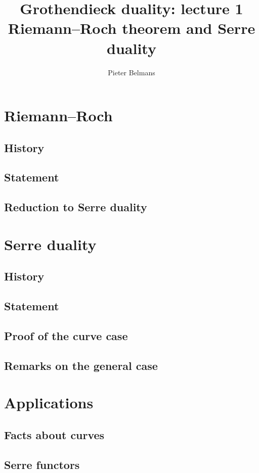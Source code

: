 \documentclass[10pt,a4paper]{article}
\title{Grothendieck duality: lecture 1 \\[.2em] \Large Riemann--Roch theorem and Serre duality}
\author{Pieter Belmans}
\begin{document}
\maketitle

\begin{abstract}
  
\end{abstract}

\tableofcontents

\section{Riemann--Roch}
\label{section:riemann-roch}
\subsection{History}
\label{section:riemann-roch-history}

\subsection{Statement}
\label{subsection:riemann-roch-statement}

\subsection{Reduction to Serre duality}
\label{subsection:reduction}


\section{Serre duality}
\label{section:serre-duality}
\subsection{History}
\label{subsection-serre-duality-history}

\subsection{Statement}
\label{subsection:serre-duality-statement}

\subsection{Proof of the curve case}
\label{subsection:serre-duality-curves}

\subsection{Remarks on the general case}
\label{subsection:remarks}


\section{Applications}
\label{section:applications}

\subsection{Facts about curves}
\label{subsection:facts-curves}

\subsection{Serre functors}
\label{subsection:serre-functors}

\printbibliography
\end{document}
